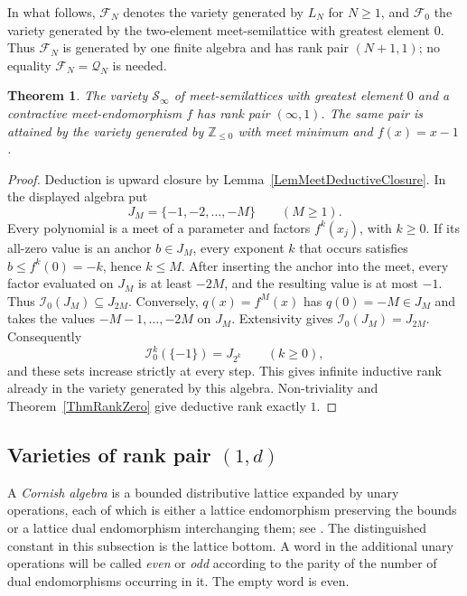 \documentclass[12pt,english]{amsart}
\newtheorem{theorem}{Theorem}[section]
\theoremstyle{definition}
\numberwithin{equation}{section}
\theoremstyle{remark}
\begin{document}
In what follows, $\mathcal F_N$ denotes the variety generated by $L_N$
for $N\geqslant1$, and $\mathcal F_0$ the variety generated by the
two-element meet-semilattice with greatest element $0$.
Thus $\mathcal F_N$ is generated by one finite algebra and has rank pair
$(N+1,1)$; no equality $\mathcal F_N=\mathcal Q_N$ is needed.

\begin{theorem}\label{ThmInfiniteInduction}
The variety $\mathcal S_\infty$ of meet-semilattices with greatest
element $0$ and a contractive meet-endomorphism $f$ has rank pair
$(\infty,1)$. The same pair is attained by the variety generated by
$\mathbb Z_{\leqslant0}$ with meet minimum and $f(x)=x-1$.
\end{theorem}

\begin{proof}
Deduction is upward closure by Lemma~\ref{LemMeetDeductiveClosure}.
In the displayed algebra put
\[
J_M=\{-1,-2,\ldots,-M\}\qquad(M\geqslant1).
\]
Every polynomial is a meet of a parameter and factors
$f^k(x_j)$, with $k\geqslant0$. If its all-zero value is an anchor
$b\in J_M$, every exponent $k$ that occurs satisfies
$b\leqslant f^k(0)=-k$, hence $k\leqslant M$. After inserting the
anchor into the meet, every factor evaluated on $J_M$ is at least
$-2M$, and the resulting value is at most $-1$. Thus
$\mathcal I_0(J_M)\subseteq J_{2M}$.
Conversely, $q(x)=f^M(x)$ has $q(0)=-M\in J_M$ and takes the values
$-M-1,\ldots,-2M$ on $J_M$. Extensivity gives
$\mathcal I_0(J_M)=J_{2M}$. Consequently
\[
\mathcal I_0^k(\{-1\})=J_{2^k}\qquad(k\geqslant0),
\]
and these sets increase strictly at every step. This gives infinite
inductive rank already in the variety generated by this algebra.
Non-triviality and Theorem~\ref{ThmRankZero} give deductive rank exactly $1$.
\end{proof}

\subsection{Varieties of rank pair \texorpdfstring{$(1,d)$}{(1,d)}}\label{SubsecCornishRanks}

A \emph{Cornish algebra} is a bounded distributive lattice expanded by
unary operations, each of which is either a lattice endomorphism
preserving the bounds or a lattice dual endomorphism interchanging
them; see \cite[Definition~5.1]{DaveyGair16}. The distinguished constant
in this subsection is the lattice bottom. A word in the additional
unary operations will be called \emph{even} or \emph{odd} according to
the parity of the number of dual endomorphisms occurring in it. The
empty word is even.
\end{document}
